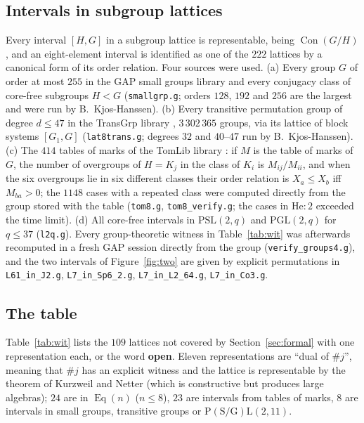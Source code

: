 \documentclass[11pt]{article}
\theoremstyle{remark}
\newcommand{\Con}{\operatorname{Con}}
\newcommand{\Eq}{\operatorname{Eq}}
\newcommand{\lat}[1]{\##1}
\begin{document}
\subsection{Intervals in subgroup lattices}
Every interval $[H,G]$ in a subgroup lattice is representable, being $\Con(G/H)$, and an
eight-element interval is identified as one of the $222$ lattices by a canonical form of its
order relation. Four sources were used. (a) Every group $G$ of order at most $255$ in the GAP small
groups library and every conjugacy class of core-free subgroups $H<G$ (\texttt{smallgrp.g}; orders
$128$, $192$ and $256$ are the largest and were run by B.~Kjos-Hanssen). (b) Every transitive
permutation group of degree $d\le 47$ in the TransGrp library \cite{TransGrp}, $3\,302\,365$ groups,
via its lattice of block systems $[G_1,G]$ (\texttt{lat8trans.g}; degrees $32$ and $40$--$47$ run by
B.~Kjos-Hanssen). (c) The $414$ tables of marks of the TomLib library \cite{TomLib}: if $M$ is the
table of marks of $G$, the number of overgroups of $H=K_j$ in the class of $K_i$ is $M_{ij}/M_{ii}$,
and when the six overgroups lie in six different classes their order relation is $X_a\le X_b$ iff
$M_{ba}>0$; the $1148$ cases with a repeated class were computed directly from the group stored with
the table (\texttt{tom8.g}, \texttt{tom8\_verify.g}; the cases in $\mathrm{He}{:}2$ exceeded the
time limit). (d) All core-free intervals in $\mathrm{PSL}(2,q)$ and $\mathrm{PGL}(2,q)$ for $q\le 37$
(\texttt{l2q.g}). Every group-theoretic witness in Table~\ref{tab:wit} was afterwards recomputed
in a fresh GAP session directly from the group (\texttt{verify\_groups4.g}), and the two intervals of
Figure~\ref{fig:two} are given by explicit permutations in \texttt{L61\_in\_J2.g},
\texttt{L7\_in\_Sp6\_2.g}, \texttt{L7\_in\_L2\_64.g}, \texttt{L7\_in\_Co3.g}.

\subsection{The table}
Table~\ref{tab:wit} lists the $109$ lattices not covered by Section~\ref{sec:formal} with one
representation each, or the word \textbf{open}. Eleven representations are ``dual of $\lat j$'',
meaning that $\lat j$ has an explicit witness and the lattice is representable by the theorem of
Kurzweil and Netter (which is constructive but produces large algebras); $24$ are in $\Eq(n)$
($n\le 8$), $23$ are intervals from tables of marks, $8$ are intervals in small groups, transitive
groups or $\mathrm{P(S/G)L}(2,11)$.
\end{document}
